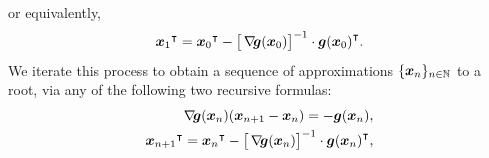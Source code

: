 or equivalently,
\begin{equation*}
{\boldsymbol{x}_1}^\intercal = {\boldsymbol{x}_0}^\intercal - \big[ \mathop{\nabla\! {\boldsymbol{g}}}(\boldsymbol{x}_0) \big]^{-1} \cdot {\boldsymbol{g}(\boldsymbol{x}_0)}^\intercal.
\end{equation*}
We iterate this process to obtain a sequence of approximations $\{ \boldsymbol{x}_n \}_{n \in \mathbb{N}}$ to a root, via any of the following two recursive formulas:
\begin{equation}\label{equation:NewtonMethod}
\begin{split}
\mathop{\nabla\! {\boldsymbol{g}}}(\boldsymbol{x}_n)(\boldsymbol{x}_{n+1}-\boldsymbol{x}_n) = -\boldsymbol{g}(\boldsymbol{x}_n), \\
{\boldsymbol{x}_{n+1}}^\intercal = {\boldsymbol{x}_n}^\intercal - \big[ \mathop{\nabla\! {\boldsymbol{g}}}(\boldsymbol{x}_n) \big]^{-1} \cdot {\boldsymbol{g}(\boldsymbol{x}_n)}^\intercal,
\end{split}
\end{equation}

